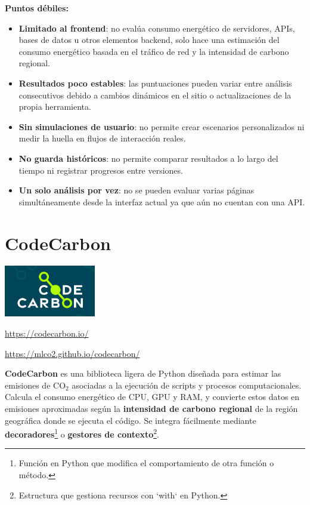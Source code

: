 \documentclass[12pt,a4paper]{report}
\begin{document}
\textbf{Puntos débiles:}
\begin{itemize}
  \item \textbf{Limitado al frontend}: no evalúa consumo energético de servidores, APIs, bases de datos u otros elementos backend, solo hace una estimación del consumo energético basada en el tráfico de red y la intensidad de carbono regional.
  \item \textbf{Resultados poco estables}: las puntuaciones pueden variar entre análisis consecutivos debido a cambios dinámicos en el sitio o actualizaciones de la propia herramienta.
  \item \textbf{Sin simulaciones de usuario}: no permite crear escenarios personalizados ni medir la huella en flujos de interacción reales.
  \item \textbf{No guarda históricos}: no permite comparar resultados a lo largo del tiempo ni registrar progresos entre versiones.
  \item \textbf{Un solo análisis por vez}: no se pueden evaluar varias páginas simultáneamente desde la interfaz actual ya que aún no cuentan con una API.
\end{itemize}

\section*{\textbf{CodeCarbon}}

\begin{center}
\includegraphics[width=0.3\textwidth]{imagenes/CodeCarbon_Logo.jpg}
\end{center}

\url{https://codecarbon.io/}

\url{https://mlco2.github.io/codecarbon/}

\textbf{CodeCarbon} es una biblioteca ligera de Python diseñada para estimar las emisiones de CO$_2$ asociadas a la ejecución de scripts y procesos computacionales. Calcula el consumo energético de CPU, GPU y RAM, y convierte estos datos en emisiones aproximadas según la \textbf{intensidad de carbono regional} de la región geográfica donde se ejecuta el código. Se integra fácilmente mediante \textbf{decoradores}\footnote{Función en Python que modifica el comportamiento de otra función o método.} o \textbf{gestores de contexto}\footnote{Estructura que gestiona recursos con `with` en Python.}.
\end{document}
